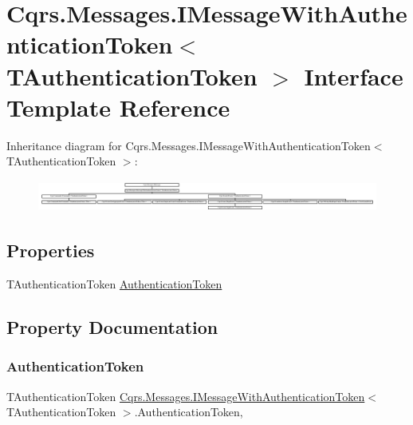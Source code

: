 \hypertarget{interfaceCqrs_1_1Messages_1_1IMessageWithAuthenticationToken}{}\section{Cqrs.\+Messages.\+I\+Message\+With\+Authentication\+Token$<$ T\+Authentication\+Token $>$ Interface Template Reference}
\label{interfaceCqrs_1_1Messages_1_1IMessageWithAuthenticationToken}
Inheritance diagram for Cqrs.\+Messages.\+I\+Message\+With\+Authentication\+Token$<$ T\+Authentication\+Token $>$\+:\begin{figure}[H]
\begin{center}
\leavevmode
\includegraphics[height=1.041667cm]{interfaceCqrs_1_1Messages_1_1IMessageWithAuthenticationToken}
\end{center}
\end{figure}
\subsection*{Properties}
\begin{DoxyCompactItemize}
\item 
T\+Authentication\+Token \hyperlink{interfaceCqrs_1_1Messages_1_1IMessageWithAuthenticationToken_ac80645a12251d6d8766b0ee18e0386f1_ac80645a12251d6d8766b0ee18e0386f1}{Authentication\+Token}
\end{DoxyCompactItemize}


\subsection{Property Documentation}
\mbox{\label{interfaceCqrs_1_1Messages_1_1IMessageWithAuthenticationToken_ac80645a12251d6d8766b0ee18e0386f1_ac80645a12251d6d8766b0ee18e0386f1}} 
\subsubsection{\texorpdfstring{Authentication\+Token}{AuthenticationToken}}
{\footnotesize\ttfamily T\+Authentication\+Token \hyperlink{interfaceCqrs_1_1Messages_1_1IMessageWithAuthenticationToken}{Cqrs.\+Messages.\+I\+Message\+With\+Authentication\+Token}$<$ T\+Authentication\+Token $>$.Authentication\+Token\hspace{0.3cm}{\ttfamily [get]}, {\ttfamily [set]}}

